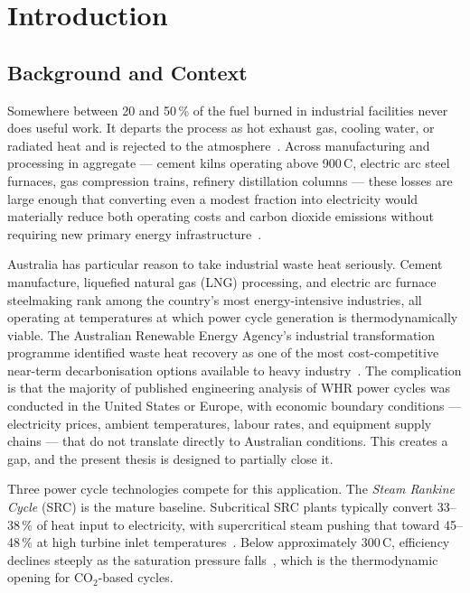\chapter{Introduction}
\label{ch:introduction}

\section{Background and Context}
\label{sec:background}

Somewhere between 20 and 50\,\% of the fuel burned in industrial facilities
never does useful work. It departs the process as hot exhaust gas, cooling
water, or radiated heat and is rejected to the
atmosphere~\cite{Johnson2008,Papapetrou2018}. Across manufacturing and
processing in aggregate --- cement kilns operating above 900\,\textdegree C,
electric arc steel furnaces, gas compression trains, refinery distillation
columns --- these losses are large enough that converting even a modest
fraction into electricity would materially reduce both operating costs and
carbon dioxide emissions without requiring new primary energy
infrastructure~\cite{Bonilla2015}.

Australia has particular reason to take industrial waste heat seriously. Cement
manufacture, liquefied natural gas (LNG) processing, and electric arc furnace
steelmaking rank among the country's most energy-intensive industries, all
operating at temperatures at which power cycle generation is thermodynamically
viable. The Australian Renewable Energy Agency's industrial transformation
programme identified waste heat recovery as one of the most cost-competitive
near-term decarbonisation options available to heavy
industry~\cite{ARENA2023}. The complication is that the majority of published
engineering analysis of WHR power cycles was conducted in the United States
or Europe, with economic boundary conditions --- electricity prices, ambient
temperatures, labour rates, and equipment supply chains --- that do not
translate directly to Australian conditions. This creates a gap, and the
present thesis is designed to partially close it.

Three power cycle technologies compete for this application. The \textit{Steam
Rankine Cycle} (SRC) is the mature baseline. Subcritical SRC plants typically
convert 33--38\,\% of heat input to electricity, with supercritical steam
pushing that toward 45--48\,\% at high turbine inlet
temperatures~\cite{Tian2022}. Below approximately 300\,\textdegree C,
efficiency declines steeply as the saturation pressure falls~\cite{Tchanche2011},
which is the thermodynamic opening for CO$_2$-based cycles.

